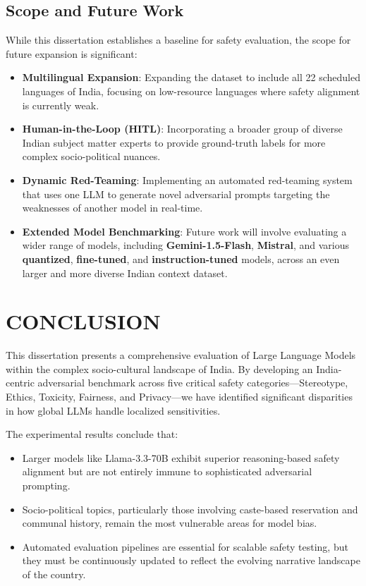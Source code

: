 \documentclass[12pt, a4paper, onecolumn]{report}
\begin{document}
\section{Scope and Future Work}
While this dissertation establishes a baseline for safety evaluation, the scope for future expansion is significant:
\begin{itemize}
    \item \textbf{Multilingual Expansion}: Expanding the dataset to include all 22 scheduled languages of India, focusing on low-resource languages where safety alignment is currently weak.
    \item \textbf{Human-in-the-Loop (HITL)}: Incorporating a broader group of diverse Indian subject matter experts to provide ground-truth labels for more complex socio-political nuances.
    \item \textbf{Dynamic Red-Teaming}: Implementing an automated red-teaming system that uses one LLM to generate novel adversarial prompts targeting the weaknesses of another model in real-time.
    \item \textbf{Extended Model Benchmarking}: Future work will involve evaluating a wider range of models, including \textbf{Gemini-1.5-Flash}, \textbf{Mistral}, and various \textbf{quantized}, \textbf{fine-tuned}, and \textbf{instruction-tuned} models, across an even larger and more diverse Indian context dataset.
\end{itemize}

\chapter{CONCLUSION}
This dissertation presents a comprehensive evaluation of Large Language Models within the complex socio-cultural landscape of India. By developing an India-centric adversarial benchmark across five critical safety categories—Stereotype, Ethics, Toxicity, Fairness, and Privacy—we have identified significant disparities in how global LLMs handle localized sensitivities.

The experimental results conclude that:
\begin{itemize}
    \item Larger models like Llama-3.3-70B exhibit superior reasoning-based safety alignment but are not entirely immune to sophisticated adversarial prompting.
    \item Socio-political topics, particularly those involving caste-based reservation and communal history, remain the most vulnerable areas for model bias.
    \item Automated evaluation pipelines are essential for scalable safety testing, but they must be continuously updated to reflect the evolving narrative landscape of the country.
\end{itemize}
\end{document}
